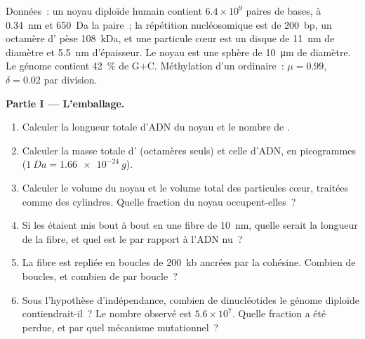 \begin{problem}
\label{pb:b3:chromatin-epigenetics:1}
Données~: un noyau diploïde humain contient $6.4\times 10^{9}$ paires
de bases, à \qty{0.34}{nm} et \qty{650}{Da} la paire~; la répétition
nucléosomique est de \qty{200}{bp}, un octamère d' pèse
\qty{108}{kDa}, et une particule cœur est un disque de \qty{11}{nm} de
diamètre et \qty{5.5}{nm} d'épaisseur. Le noyau est une sphère de
\qty{10}{\micro m} de diamètre. Le génome contient \qty{42}{\%} de
G$+$C. Méthylation d'un  ordinaire~: $\mu = 0.99$, $\delta = 0.02$
par division.

\medskip
\noindent\textbf{Partie I --- L'emballage.}
\begin{enumerate}
  \item Calculer la longueur totale d'ADN du noyau et le nombre de
        .
  \item Calculer la masse totale d' (octamères seuls) et celle
        d'ADN, en picogrammes ($\qty{1}{Da} = \qty{1.66e-24}{g}$).
  \item Calculer le volume du noyau et le volume total des particules
        cœur, traitées comme des cylindres. Quelle fraction du noyau
        occupent-elles~?
  \item Si les  étaient mis bout à bout en une fibre de
        \qty{10}{nm}, quelle serait la longueur de la fibre, et quel
        est le  par rapport à l'ADN nu~?
  \item La fibre est repliée en boucles de \qty{200}{kb} ancrées par la
        cohésine. Combien de boucles, et combien de  par
        boucle~?
  \item Sous l'hypothèse d'indépendance, combien de dinucléotides 
        le génome diploïde contiendrait-il~? Le nombre observé est
        $5.6\times 10^{7}$. Quelle fraction a été perdue, et par quel
        mécanisme mutationnel~?
\end{enumerate}


\end{problem}

